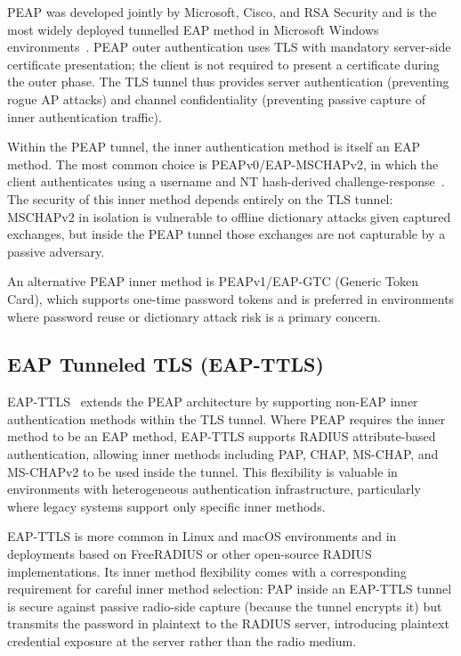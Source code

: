 \documentclass[journal]{IEEEtran}
\begin{document}
PEAP was developed jointly by Microsoft, Cisco, and RSA Security and is the most
widely deployed tunnelled EAP method in Microsoft Windows environments~\cite{peap}.
PEAP outer authentication uses TLS with mandatory server-side certificate presentation;
the client is not required to present a certificate during the outer phase. The
TLS tunnel thus provides server authentication (preventing rogue AP attacks) and
channel confidentiality (preventing passive capture of inner authentication traffic).

Within the PEAP tunnel, the inner authentication method is itself an EAP method.
The most common choice is PEAPv0/EAP-MSCHAPv2, in which the client authenticates
using a username and NT hash-derived challenge-response~\cite{peap}. The security
of this inner method depends entirely on the TLS tunnel: MSCHAPv2 in isolation is
vulnerable to offline dictionary attacks given captured exchanges, but inside the
PEAP tunnel those exchanges are not capturable by a passive adversary.

An alternative PEAP inner method is PEAPv1/EAP-GTC (Generic Token Card), which
supports one-time password tokens and is preferred in environments where password
reuse or dictionary attack risk is a primary concern.

\subsection{EAP Tunneled TLS (EAP-TTLS)}

EAP-TTLS~\cite{rfc5281} extends the PEAP architecture by supporting non-EAP inner
authentication methods within the TLS tunnel. Where PEAP requires the inner method
to be an EAP method, EAP-TTLS supports RADIUS attribute-based authentication,
allowing inner methods including PAP, CHAP, MS-CHAP, and MS-CHAPv2 to be used inside
the tunnel. This flexibility is valuable in environments with heterogeneous
authentication infrastructure, particularly where legacy systems support only specific
inner methods.

EAP-TTLS is more common in Linux and macOS environments and in deployments based on
FreeRADIUS or other open-source RADIUS implementations. Its inner method flexibility
comes with a corresponding requirement for careful inner method selection: PAP inside
an EAP-TTLS tunnel is secure against passive radio-side capture (because the tunnel
encrypts it) but transmits the password in plaintext to the RADIUS server,
introducing plaintext credential exposure at the server rather than the radio medium.
\end{document}
